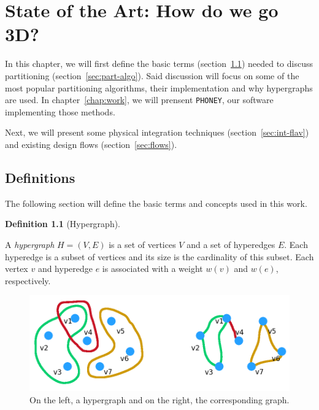 \documentclass[11pt,a4paper]{report} %
\theoremstyle{customdef}
\newtheorem{definition}{Definition}
\newenvironment{defi}[2]
 {\begin{definition}[#1]\label{#2}\end{definition}\begin{siderules}}
 {\end{siderules}}
\begin{document}

\chapter{State of the Art: How do we go 3D?}\label{chap:soa}

In this chapter, we will first define the basic terms (section~\ref{sec:def}) needed to discuss partitioning (section~\ref{sec:part-algo}).
Said discussion will focus on some of the most popular partitioning algorithms, their implementation and why hypergraphs are used.
In chapter~\ref{chap:work}, we will prensent \texttt{PHONEY}, our software implementing those methods.

Next, we will present some physical integration techniques (section~\ref{sec:int-flav}) and existing design flows (section~\ref{sec:flows}).






\section{Definitions}\label{sec:def}
The following section will define the basic terms and concepts used in this work.

\begin{defi}{Hypergraph}{def:hypergraph}
A \emph{hypergraph} $H = (V, E)$ is a set of vertices $V$ and a set of hyperedges $E$.
Each hyperedge is a subset of vertices and its size is the cardinality of this subset.
Each vertex $v$ and hyperedge $e$ is associated with a weight $w(v)$ and $w(e)$, respectively.
\end{defi}

\begin{figure}[!h]
\centering
\includegraphics[width=.9\textwidth]{img/hypergraph-graph.png}
\caption{On the left, a hypergraph and on the right, the corresponding graph.}
\label{fig:hypergraph-graph}
\end{figure}
\end{document}
